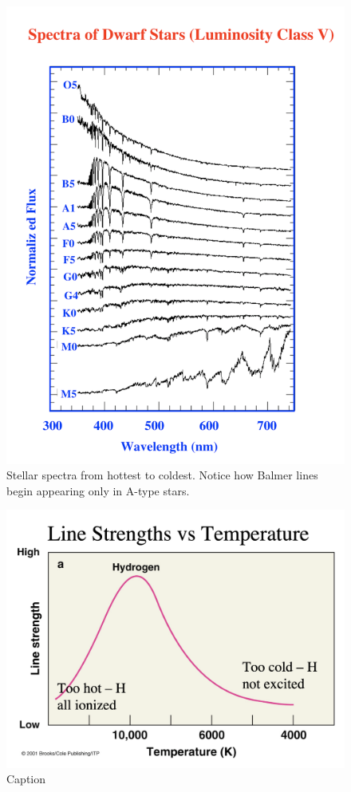 \begin{figure}
    \centering
    \includegraphics[scale=0.75]{Notes_Images/stellar_spectra.png}
    \caption{Stellar spectra from hottest to coldest. Notice how Balmer lines begin appearing only in A-type stars.}
    \label{fig:enter-label}
\end{figure}
\newpage
\begin{figure}
    \centering
    \includegraphics[scale=0.4]{Notes_Images/ionisation2.png}
    \caption{Caption}
    \label{fig:enter-label}
\end{figure}
